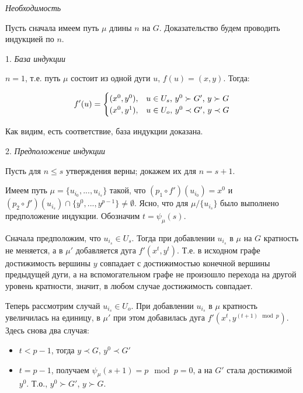 	\begin{myproof}
		
		\textit {Необходимость}
		
		Пусть сначала имеем путь $\mu$ длины $n$ на $G$. Доказательство будем проводить индукцией по $n$.
		
		1. \textit {База индукции}
		
		$n = 1$, т.е. путь $\mu$ состоит из одной дуги $u$, $f(u) = (x, y)$. Тогда:
		
		\begin{equation*}
		f'(u) = 
		\begin{cases}
		(x^0, y^0), &\text{$ u \in U_s$, $y^0 \succ G'$, $y \succ G$}\\
		(x^0, y^1), &\text{$ u \in U_o$, $y^0 \prec G'$, $y \prec G$}
		\end{cases}
		\end{equation*} 
		
		Как видим, есть соответствие, база индукции доказана.
		
		2. \textit {Предположение индукции}
		
		Пусть для $ n \leq s$ утверждения верны; докажем их для $ n = s + 1$.
		
		Имеем путь $\mu = \{u_{i_0}, ... , u_{i_s}\}$ такой, что $(p_1 \circ f')(u_{i_0}) = x^0$ и $(p_2 \circ f')(u_{i_s}) \cap \{y^0, ... , y^{p-1}\} \neq \emptyset$. Ясно, что для $\mu / \{u_{i_s}\}$ было выполнено предположение индукции. Обозначим $t = \psi_\mu(s)$.
		
		Сначала предположим, что $u_{i_s} \in U_s$. Тогда при добавлении $u_{i_s}$ в $\mu$ на $G$ кратность не меняется, а в $\mu'$ добавляется дуга $f'(x^t, y^t)$. Т.е. в исходном графе достижимость вершины $y$ совпадает с достижимостью конечной вершины предыдущей дуги, а на вспомогательном графе не произошло перехода на другой уровень кратности, значит, в любом случае достижимость совпадает. 
		
		Теперь рассмотрим случай $u_{i_s} \in U_o$. При добавлении $u_{i_s}$ в $\mu$ кратность увеличилась на единицу, в $\mu'$ при этом добавилась дуга $f'(x^t, y^{(t+1) \mod p})$. Здесь снова два случая:
		
		\begin{itemize}
			\item $t < p - 1$, тогда  $y \prec G$, $y^0 \prec G'$
			\item $t = p - 1$, получаем $\psi_\mu(s+1) = p\mod p = 0$, а на $G'$ стала достижимой $y^0$. Т.о., $y^0 \succ G'$, $y \succ G$.
		\end{itemize}
		

\end{myproof}
